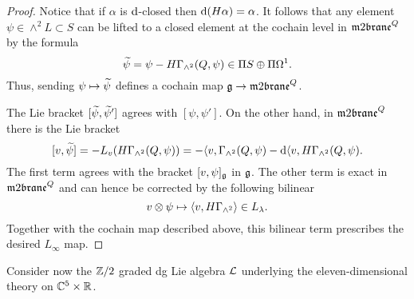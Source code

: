 \documentclass[11pt]{amsart}
\begin{document}
\begin{proof}
Notice that if $\alpha$ is $\d$-closed then $\d (H \alpha) = \alpha$. 
It follows that any element $\psi \in \wedge^2 L \subset S$ can be lifted to a closed element at the cochain level in $\m2^Q$ by the formula
\[
\Tilde{\psi} = \psi - H \Gamma_{\wedge^2} (Q, \psi) \in \Pi S \oplus \Pi \Omega^1 .
\]
Thus, sending $\psi \mapsto \Tilde{\psi}$ defines a cochain map $\fg \to \m2^Q$. 

The Lie bracket $[\Tilde{\psi}, \Tilde{\psi}']$ agrees with $[\psi, \psi']$. 
On the other hand, in $\m2^Q$ there is the Lie bracket 
\[
[v,\Tilde{\psi}] = - L_v (H \Gamma_{\wedge^2} (Q, \psi)) = -\<v, \Gamma_{\wedge^2}(Q, \psi) - \d \<v, H \Gamma_{\wedge^2}(Q, \psi) .
\]
The first term agrees with the bracket $[v, \psi]_{\fg}$ in $\fg$. 
The other term is exact in $\m2^Q$ and can hence be corrected by the following bilinear  
\[
v \otimes \psi \mapsto \<v, H \Gamma_{\wedge^2} \> \in L_\lambda .
\] 
Together with the cochain map described above, this bilinear term prescribes the desired $L_\infty$ map. 

\end{proof}

\parsec[]
Consider now the $\ZZ/2$ graded dg Lie algebra $\cL$ underlying the eleven-dimensional theory on $\CC^5 \times \RR$. 
\end{document}
